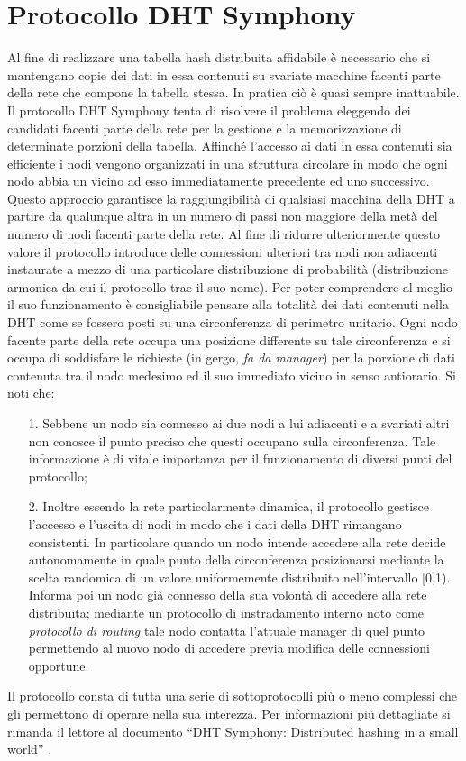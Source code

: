\documentclass[	
	DIV=calc,
	paper=a4,
	fontsize=11pt,
	onecolumn
]{scrartcl} %
\begin{document}
\section{Protocollo DHT Symphony}
	Al fine di realizzare una tabella hash distribuita affidabile è necessario che si mantengano copie dei dati in essa contenuti su svariate macchine facenti parte della rete che compone la tabella stessa. In pratica ciò è quasi sempre inattuabile. Il protocollo DHT Symphony tenta di risolvere il problema eleggendo dei candidati facenti parte della rete per la gestione e la memorizzazione di determinate porzioni della tabella. Affinché l'accesso ai dati in essa contenuti sia efficiente i nodi vengono organizzati in una struttura circolare in modo che ogni nodo abbia un vicino ad esso immediatamente precedente ed uno successivo. Questo approccio garantisce la raggiungibilità di qualsiasi macchina della DHT a partire da qualunque altra in un numero di passi non maggiore della metà del numero di nodi facenti parte della rete. Al fine di ridurre ulteriormente questo valore il protocollo introduce delle connessioni ulteriori tra nodi non adiacenti instaurate a mezzo di una particolare distribuzione di probabilità (distribuzione armonica da cui il protocollo trae il suo nome). Per poter comprendere al meglio il suo funzionamento è consigliabile pensare alla totalità dei dati contenuti nella DHT come se fossero posti su una circonferenza di perimetro unitario. Ogni nodo facente parte della rete occupa una posizione differente su tale circonferenza e si occupa di soddisfare le richieste (in gergo, \textit{fa da manager}) per la porzione di dati contenuta tra il nodo medesimo ed il suo immediato vicino in senso antiorario. Si noti che:
\begin{itemize}
	\item[1.] Sebbene un nodo sia connesso ai due nodi a lui adiacenti e a svariati altri non conosce il punto preciso che questi occupano sulla circonferenza. Tale informazione è di vitale importanza per il funzionamento di diversi punti del protocollo;
	\item[2.] Inoltre essendo la rete particolarmente dinamica, il protocollo gestisce l'accesso e l'uscita di nodi in modo che i dati della DHT rimangano consistenti. In particolare quando un nodo intende accedere alla rete decide autonomamente in quale punto della circonferenza posizionarsi mediante la scelta randomica di un valore uniformemente distribuito nell'intervallo [0,1). Informa poi un nodo già connesso della sua volontà di accedere alla rete distribuita; mediante un protocollo di instradamento interno noto come \textit{protocollo di routing} tale nodo contatta l'attuale manager di quel punto permettendo al nuovo nodo di accedere previa modifica delle connessioni opportune.
\end{itemize}
Il protocollo consta di tutta una serie di sottoprotocolli più o meno complessi che gli permettono di operare nella sua interezza. Per informazioni più dettagliate si rimanda il lettore al documento ``DHT Symphony: Distributed hashing in a small world'' \cite{ref1}.
\end{document}
